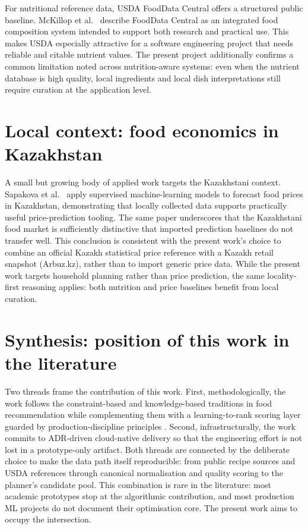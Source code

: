 For nutritional reference data, USDA FoodData Central offers a structured public baseline. McKillop et al.\ \cite{mckillop2021} describe FoodData Central as an integrated food composition system intended to support both research and practical use. This makes USDA especially attractive for a software engineering project that needs reliable and citable nutrient values. The present project additionally confirms a common limitation noted across nutrition-aware systems: even when the nutrient database is high quality, local ingredients and local dish interpretations still require curation at the application level.

\section{Local context: food economics in Kazakhstan}

A small but growing body of applied work targets the Kazakhstani context. Sapakova et al.\ \cite{sapakova2023application} apply supervised machine-learning models to forecast food prices in Kazakhstan, demonstrating that locally collected data supports practically useful price-prediction tooling. The same paper underscores that the Kazakhstani food market is sufficiently distinctive that imported prediction baselines do not transfer well. This conclusion is consistent with the present work's choice to combine an official Kazakh statistical price reference with a Kazakh retail snapshot (Arbuz.kz), rather than to import generic price data. While the present work targets household planning rather than price prediction, the same locality-first reasoning applies: both nutrition and price baselines benefit from local curation.

\section{Synthesis: position of this work in the literature}

Two threads frame the contribution of this work. First, methodologically, the work follows the constraint-based and knowledge-based traditions in food recommendation \cite{felfernig2008,pawar2016,jung2016} while complementing them with a learning-to-rank scoring layer \cite{ke2017} guarded by production-discipline principles \cite{sculley2015}. Second, infrastructurally, the work commits to ADR-driven cloud-native delivery \cite{erder2015,burns2016} so that the engineering effort is not lost in a prototype-only artifact. Both threads are connected by the deliberate choice to make the data path itself reproducible: from public recipe sources and USDA references \cite{mckillop2021} through canonical normalisation and quality scoring to the planner's candidate pool. This combination is rare in the literature: most academic prototypes stop at the algorithmic contribution, and most production ML projects do not document their optimisation core. The present work aims to occupy the intersection.

